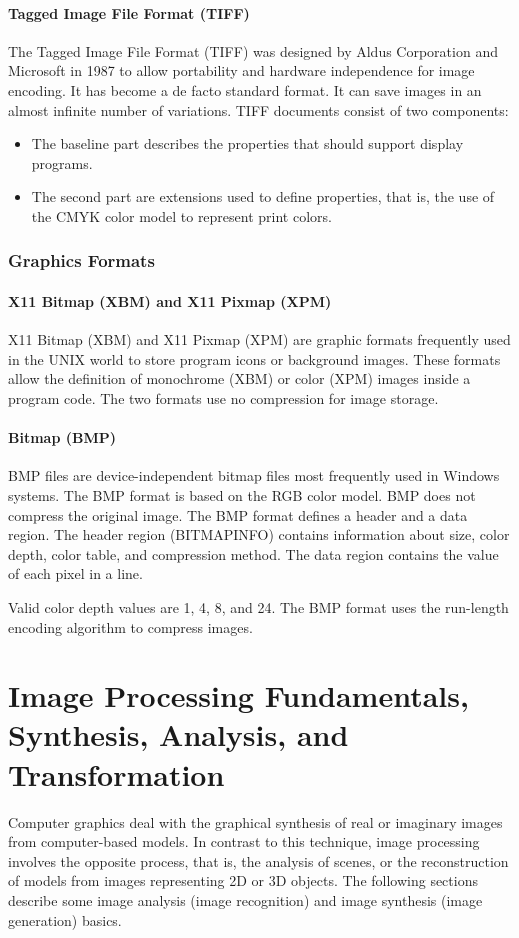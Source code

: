 \paragraph*{Tagged Image File Format (TIFF)}
The Tagged Image File Format (TIFF) was designed by Aldus Corporation and Microsoft in 1987 to allow portability and hardware independence for image encoding. It has become a de facto standard format. It can save images in an almost infinite number of variations. TIFF documents consist of two components:

\begin{itemize}
	\item The baseline part describes the properties that should support display programs. 
	\item The second part are extensions used to define properties, that is, the use of the CMYK color model to represent print colors.
\end{itemize} 

\subsubsection{Graphics Formats}
\paragraph*{X11 Bitmap (XBM) and X11 Pixmap (XPM)}
X11 Bitmap (XBM) and X11 Pixmap (XPM) are graphic formats frequently used in the UNIX world to store program icons or background images. These formats allow the definition of monochrome (XBM) or color (XPM) images inside a program code. The two formats use no compression for image storage.


\paragraph*{Bitmap (BMP)}
BMP files are device-independent bitmap files most frequently used in Windows systems. The BMP format is based on the RGB color model. BMP does not compress the original image. The BMP format defines a header and a data region. The header region (BITMAPINFO) contains information about size, color depth, color table, and compression method. The data region contains the value of each pixel in a line. 

Valid color depth values are 1, 4, 8, and 24. The BMP format uses the run-length encoding algorithm to compress images.

\section{Image Processing Fundamentals, Synthesis, Analysis, and Transformation}
Computer graphics deal with the graphical synthesis of real or imaginary images from computer-based models. In contrast to this technique, image processing involves
the opposite process, that is, the analysis of scenes, or the reconstruction of models from images representing 2D or 3D objects. The following sections describe some image analysis (image recognition) and image synthesis (image generation) basics.

